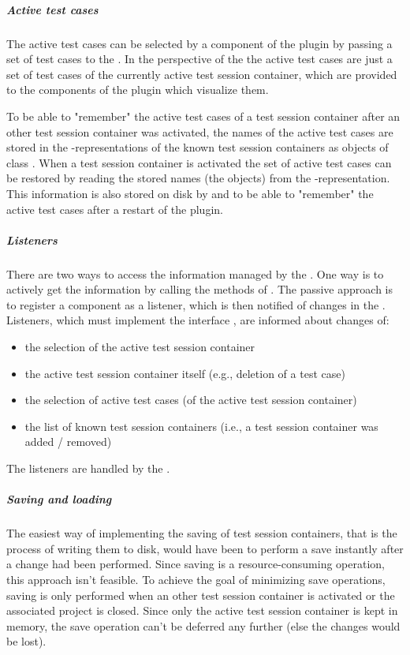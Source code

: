 \subparagraph{Active test cases} \label{Overview:Eclipse:Data_management:Active_test_cases}

The active test cases can be selected by a component of the plugin by passing a set of test cases to the . In the perspective of the  the active test cases are just a set of test cases of the currently active test session container, which are provided to the components of the plugin which visualize them.

To be able to "remember" the active test cases of a test session container after an other test session container was activated, the names of the active test cases are stored in the -representations of the known test session containers as objects of class . When a test session container is activated the set of active test cases can be restored by reading the stored names (the  objects) from the -representation. This information is also stored on disk by  and  to be able to "remember" the active test cases after a restart of the plugin. 

\subparagraph{Listeners}

There are two ways to access the information managed by the . One way is to actively get the information by calling the methods of . The passive approach is to register a component as a listener, which is then notified of changes in the . Listeners, which must implement the interface , are informed about changes of:
\begin{itemize}
\item the selection of the active test session container
\item the active test session container itself (e.g., deletion of a test case)
\item the selection of active test cases (of the active test session container)
\item the list of known test session containers (i.e., a test session container was added / removed)
\end{itemize}
The listeners are handled by the .

\subparagraph{Saving and loading}

The easiest way of implementing the saving of test session containers, that is the process of writing them to disk, would have been to perform a save instantly after a change had been performed. Since saving is a resource-consuming operation, this approach isn't feasible. To achieve the goal of minimizing save operations, saving is only performed when an other test session container is activated or the associated project is closed. Since only the active test session container is kept in memory, the save operation can't be deferred any further (else the changes would be lost).

